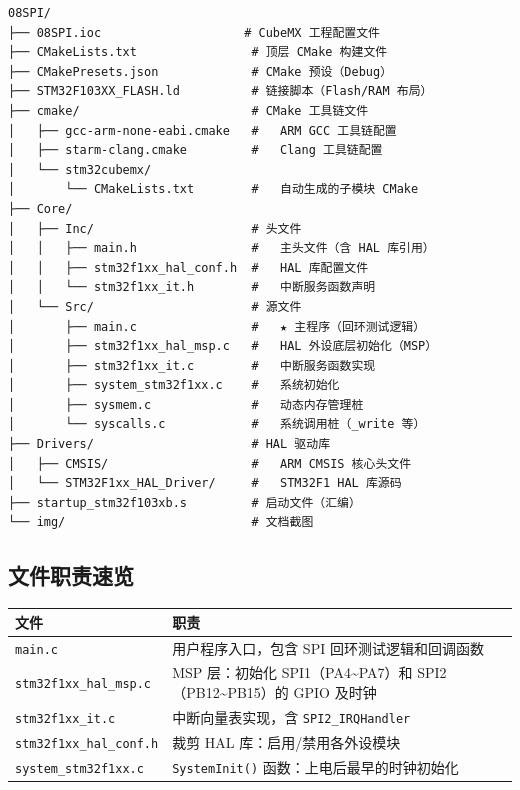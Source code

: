 \documentclass[
  chinese,
  UTF8,
  oneside,
  openany]{ctexbook}
\begin{document}
\begin{verbatim}
08SPI/
├── 08SPI.ioc                    # CubeMX 工程配置文件
├── CMakeLists.txt                # 顶层 CMake 构建文件
├── CMakePresets.json             # CMake 预设（Debug）
├── STM32F103XX_FLASH.ld          # 链接脚本（Flash/RAM 布局）
├── cmake/                        # CMake 工具链文件
│   ├── gcc-arm-none-eabi.cmake   #   ARM GCC 工具链配置
│   ├── starm-clang.cmake         #   Clang 工具链配置
│   └── stm32cubemx/
│       └── CMakeLists.txt        #   自动生成的子模块 CMake
├── Core/
│   ├── Inc/                      # 头文件
│   │   ├── main.h                #   主头文件（含 HAL 库引用）
│   │   ├── stm32f1xx_hal_conf.h  #   HAL 库配置文件
│   │   └── stm32f1xx_it.h        #   中断服务函数声明
│   └── Src/                      # 源文件
│       ├── main.c                #   ★ 主程序（回环测试逻辑）
│       ├── stm32f1xx_hal_msp.c   #   HAL 外设底层初始化（MSP）
│       ├── stm32f1xx_it.c        #   中断服务函数实现
│       ├── system_stm32f1xx.c    #   系统初始化
│       ├── sysmem.c              #   动态内存管理桩
│       └── syscalls.c            #   系统调用桩（_write 等）
├── Drivers/                      # HAL 驱动库
│   ├── CMSIS/                    #   ARM CMSIS 核心头文件
│   └── STM32F1xx_HAL_Driver/     #   STM32F1 HAL 库源码
├── startup_stm32f103xb.s         # 启动文件（汇编）
└── img/                          # 文档截图
\end{verbatim}

\subsection{文件职责速览}\label{ux6587ux4ef6ux804cux8d23ux901fux89c8-2}

\begin{longtable}[]{@{}
  >{\raggedright\arraybackslash}p{}
  >{\raggedright\arraybackslash}p{}@{}}
\toprule\noalign{}
\begin{minipage}[b]{\linewidth}\raggedright
文件
\end{minipage} & \begin{minipage}[b]{\linewidth}\raggedright
职责
\end{minipage} \\
\midrule\noalign{}
\endhead
\bottomrule\noalign{}
\endlastfoot
\texttt{main.c} & 用户程序入口，包含 SPI 回环测试逻辑和回调函数 \\
\texttt{stm32f1xx\_hal\_msp.c} & MSP 层：初始化
SPI1（PA4\textasciitilde PA7）和 SPI2（PB12\textasciitilde PB15）的 GPIO
及时钟 \\
\texttt{stm32f1xx\_it.c} & 中断向量表实现，含
\texttt{SPI2\_IRQHandler} \\
\texttt{stm32f1xx\_hal\_conf.h} & 裁剪 HAL 库：启用/禁用各外设模块 \\
\texttt{system\_stm32f1xx.c} & \texttt{SystemInit()}
函数：上电后最早的时钟初始化 \\
\end{longtable}
\end{document}
